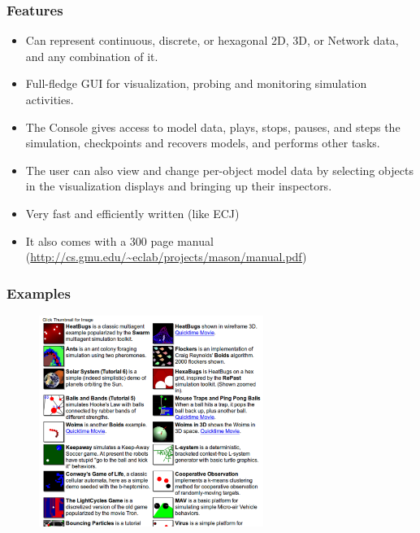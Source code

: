 \documentclass{beamer}
\begin{document}
\begin{frame}
	\frametitle{Features}
	\begin{footnotesize}
	\begin{itemize}
		\item Can represent continuous, discrete, or hexagonal 2D, 3D, or Network data, and any combination of it.  
		\item Full-fledge GUI for visualization, probing and monitoring simulation activities.
		\item The Console gives access to model data, plays, stops, pauses, and steps the simulation, checkpoints and recovers models, and performs other tasks.  
		\item The user can also view and change per-object model data by selecting objects in the visualization displays and bringing up their inspectors.
		\item Very fast and efficiently written (like ECJ)
		\item It also comes with a 300 page manual (\url{http://cs.gmu.edu/~eclab/projects/mason/manual.pdf})
	\end{itemize}
	\end{footnotesize}
\end{frame}
\begin{frame}
	\frametitle{Examples}
	\begin{figure}
		\vspace{-20pt}
		\includegraphics[width=0.65\textwidth,keepaspectratio]{mason-applet.pdf}
	\end{figure}
\end{frame}
\end{document}
